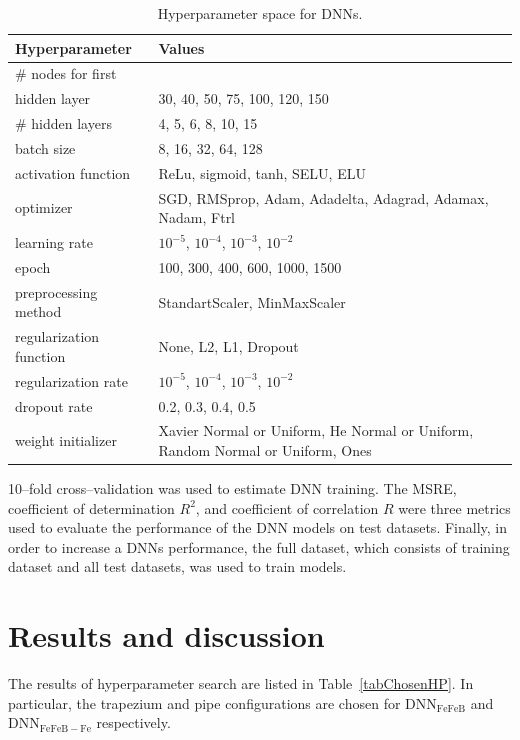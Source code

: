 \documentclass[a4paper,fleqn]{cas-sc}
\begin{document}
\begin{table}[width=\linewidth,cols=2,pos=h]
\caption{Hyperparameter space for DNNs.}\label{tabHP}
\begin{tabular*}{\tblwidth}{@{} LL@{} }
\toprule
Hyperparameter & Values\\
\midrule
\# nodes for first &\\
hidden layer & 30, 40, 50, 75, 100, 120, 150 \\
\# hidden layers & 4, 5, 6, 8, 10, 15 \\
 batch size & 8, 16, 32, 64, 128 \\
activation function & ReLu, sigmoid, tanh, SELU, ELU \\
optimizer & SGD, RMSprop, Adam, Adadelta, Adagrad, Adamax, Nadam, Ftrl \\
learning rate & $10^{-5}$, $10^{-4}$, $10^{-3}$, $10^{-2}$\\
epoch & 100, 300, 400, 600, 1000, 1500\\
preprocessing method & StandartScaler, MinMaxScaler \\
regularization function& None, L2, L1, Dropout\\
regularization rate & $10^{-5}$, $10^{-4}$, $10^{-3}$, $10^{-2}$\\
dropout rate & 0.2, 0.3, 0.4, 0.5 \\
weight initializer& Xavier Normal or Uniform, He Normal or Uniform, Random Normal or Uniform, Ones\\
\bottomrule
\end{tabular*}
\end{table}

10--fold cross--validation was used to estimate DNN training.
The MSRE, coefficient of determination $R^2$, and coefficient of correlation $R$ were
three metrics used to evaluate the performance of the DNN models on test datasets.
Finally, in order to increase a DNNs performance, the full dataset, which consists of training dataset and all test datasets,  was used  to train models.

\section{Results and discussion}

The results of hyperparameter search are listed in Table~\ref{tabChosenHP}.
In particular, the trapezium and pipe configurations are chosen for DNN$_\mathrm{FeFeB}$ and DNN$_\mathrm{FeFeB-Fe}$ respectively.
\end{document}
